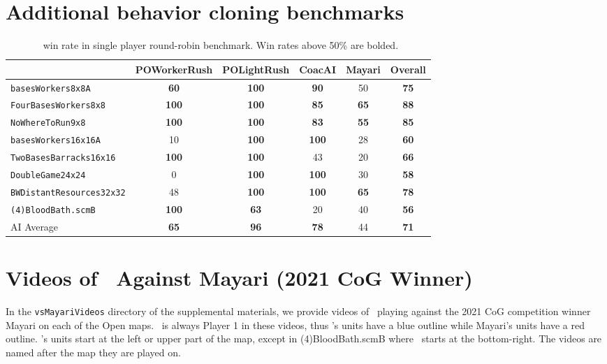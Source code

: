 \documentclass[conference,onecolumn]{IEEEtran}
\newcounter{supptable}
\newenvironment{supptable}
  {\renewcommand{\tablename}{Supplemental Table}\setcounter{table}{\value{supptable}}\addtocounter{supptable}{1}\begin{table}}
  {\end{table}\setcounter{supptable}{\value{table}}}
\newcommand{\mapname}[1]{#1} %
\begin{document}
\section{Additional behavior cloning benchmarks}
\begin{supptable}[H]
    \caption{\bcAgent\ win rate in single player round-robin benchmark. Win rates above 50\% are bolded.}
    \label{tab:bc-winrate}
    \begin{center}
    \begin{tabular}{lcccc|c}
     & POWorkerRush & POLightRush & CoacAI & Mayari & Overall \\
    \midrule
    \texttt{basesWorkers8x8A} & \textbf{60} & \textbf{100} & \textbf{90} & 50 & \textbf{75} \\
    \texttt{FourBasesWorkers8x8} & \textbf{100} & \textbf{100} & \textbf{85} & \textbf{65} & \textbf{88} \\
    \texttt{NoWhereToRun9x8} & \textbf{100} & \textbf{100} & \textbf{83} & \textbf{55} & \textbf{85} \\
    \texttt{basesWorkers16x16A} & 10 & \textbf{100} & \textbf{100} & 28 & \textbf{60} \\
    \texttt{TwoBasesBarracks16x16} & \textbf{100} & \textbf{100} & 43 & 20 & \textbf{66} \\
    \texttt{DoubleGame24x24} & 0 & \textbf{100} & \textbf{100} & 30 & \textbf{58} \\
    \texttt{BWDistantResources32x32} & 48 & \textbf{100} & \textbf{100} & \textbf{65} & \textbf{78} \\
    \texttt{(4)BloodBath.scmB} & \textbf{100} & \textbf{63} & 20 & 40 & \textbf{56} \\
    \hline
    AI Average & \textbf{65} & \textbf{96} & \textbf{78} & 44 & \textbf{71} \\
    \end{tabular}
    \end{center}
\end{supptable}

\section{Videos of \agentName\ Against Mayari (2021 CoG Winner)}
In the \texttt{vsMayariVideos} directory of the supplemental materials, we provide videos of
\agentName\ playing against the 2021 CoG competition winner Mayari on each of the Open
maps. \agentName\ is always Player 1 in these videos, thus \agentName's units have a
blue outline while Mayari's units have a red outline. \agentName's units start at the left or
upper part of the map, except in \mapname{(4)BloodBath.scmB} where \agentName\ starts at the
bottom-right. The videos are named after the map they are played on.



\end{document}
